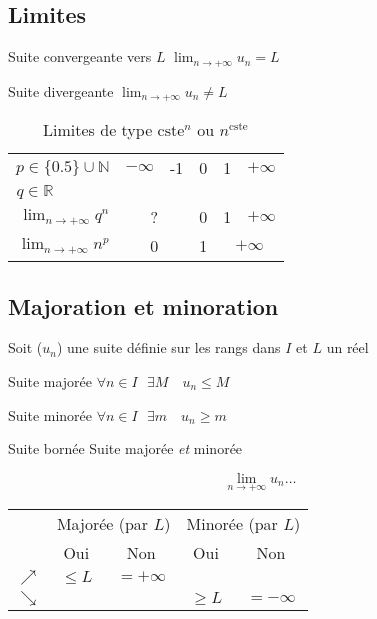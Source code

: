 \documentclass{article}
\newcommand{\R}{\mathds{R}}
\newcommand{\N}{\mathds{N}}
\newcommand{\oo}{\infty}
\newcommand{\twoCols}[1]{\multicolumn{2}{c|}{#1}}
\newcommand{\twoColsNB}[1]{\multicolumn{2}{c}{#1}}
\newcommand{ \const}{\text{cste}}
\newenvironment{descriptiona}{\begin{description}[leftmargin=!,labelwidth=\widthof{\bfseries The longest label}]}{\end{description}}
\begin{document}
\subsection{Limites}
\begin{descriptiona}
\item[Suite convergeante vers $L$] $\displaystyle \lim_{n\to+\oo} u_n = L$
\item[Suite divergeante] $\displaystyle \lim_{n\to+\oo} u_n \not= L$
\end{descriptiona}

\begin{minipage}{\textwidth}

\begin{table}[H]
    \centering
    \begin{tabular}{r||l|c|c|c|l}
         $p \in \{0.5\}\cup\N$            & $-\infty$ & -1 & 0 & 1 & $+\infty$  \\
         $q \in \R\quad\quad\quad\;\:$ & & & & \\\hline\hline
        $\displaystyle\lim_{n\to+\infty} q^n$ & \twoCols{?} & 0 & 1 & $+\infty$ \\\hline
        $\displaystyle\lim_{n\to+\infty} n^p$ & \twoCols{0} & 1 & \twoColsNB{$+\infty$}
    \end{tabular}
    \caption*{Limites de type $\const^n$ ou $n^\const$}
    \label{tab:my_label}
\end{table}


\end{minipage}

\subsection{Majoration et minoration}

Soit ($u_n$) une suite définie sur les rangs dans $I$ et $L$ un réel
\begin{descriptiona}
\item[Suite majorée] $\forall n \in I \:\:\: \exists M \quad u_n \leq M$
\item[Suite minorée] $\forall n \in I \:\:\: \exists m \quad u_n \geq m$
\item[Suite bornée] Suite majorée \textit{et} minorée
\end{descriptiona}

\[\lim_{n\to+\oo} u_n \dots\]

\begin{table}[H]
    \centering
    \begin{tabular}{c|cccc}
                & \multicolumn{2}{c}{Majorée (par $L$)}   & \multicolumn{2}{c}{Minorée (par $L$)}    \\
                & Oui               & Non                 & Oui                 & Non                \\
                \hline
    $\nearrow$  & $\leq L$          & $= +\oo$            &                     &                    \\
    $\searrow$  &                   &                     & $\geq L$            & $=-\oo$
    \end{tabular}
\end{table}
\end{document}
